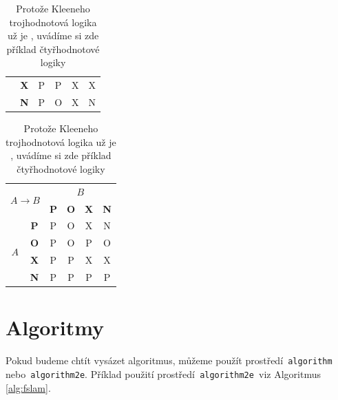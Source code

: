 \documentclass[a4paper, 11pt]{article}
\begin{document}
\begin{table}[h!]
\begin{tabular}{|c|c|c|c|c|c|}
		                                                  & \textbf{X}               & P          & P          & X          & X  \\ \cline{2-6}
		                                                  & \textbf{N}               & P          & O          & X          & N  \\ \cline{2-6}
		\hline
	\end{tabular}
	\begin{tabular}{|c|c|c|c|c|c|}
		\hline
		\multicolumn{2}{|c|}{\multirow{2}{*}{$A \rightarrow B$}} & \multicolumn{4}{c|}{$B$}                                             \\\cline{3-6}
		\multicolumn{2}{|c|}{ }                                  & \textbf{P}               & \textbf{O} & \textbf{X} & \textbf{N}      \\
		\hline
		\multirow{4}{*}{$A$}
		                                                         & \textbf{P}               & P          & O          & X          & N  \\ \cline{2-6}
		                                                         & \textbf{O}               & P          & O          & P          & O  \\ \cline{2-6}
		                                                         & \textbf{X}               & P          & P          & X          & X  \\ \cline{2-6}
		                                                         & \textbf{N}               & P          & P          & P          & P  \\ \cline{2-6}
		\hline
	\end{tabular}

	\caption{Protože Kleeneho trojhodnotová logika už je ,
		uvádíme si zde příklad čtyřhodnotové logiky}
	\label{tab:log}

\end{table}
\bigskip


\pagebreak

\section{Algoritmy}

Pokud budeme chtít vysázet algoritmus, m\r{u}žeme použít
prostředí\texttt{ algorithm\footnotemark[2] }
nebo\texttt{ algorithm2e\footnotemark[3]}. Příklad použití
prostředí\texttt{ algorithm2e }viz Algoritmus \ref{alg:fslam}.
\end{document}
